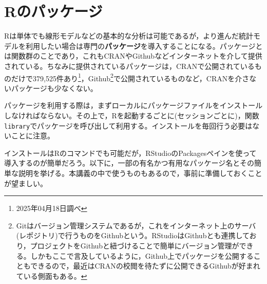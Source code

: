 \documentclass[
  a4paper,
]{ltjsbook}
\begin{document}
\section{Rのパッケージ}\label{rux306eux30d1ux30c3ux30b1ux30fcux30b8}

Rは単体でも線形モデルなどの基本的な分析は可能であるが，より進んだ統計モデルを利用したい場合は専門の\textbf{パッケージ}を導入することになる。パッケージとは関数群のことであり，これもCRANやGithubなどインターネットを介して提供されている。ちなみに提供されているパッケージは，CRANで公開されているものだけで379,525件あり\footnote{2025年04月18日調べ}，Github\footnote{Gitはバージョン管理システムであるが，これをインターネット上のサーバ(レポジトリ)で行うものをGithubという。RStudioはGithubとも連携しており，プロジェクトをGithubと紐づけることで簡単にバージョン管理ができる。しかもここで言及しているように，Github上でパッケージを公開することもできるので，最近はCRANの校閲を待たずに公開できるGithubが好まれている側面もある。}で公開されているものなど，CRANを介さないパッケージも少なくない。

パッケージを利用する際は，まずローカルにパッケージファイルをインストールしなければならない。その上で，Rを起動するごとに(セッションごとに)，関数\texttt{library}でパッケージを呼び出して利用する。インストールを毎回行う必要はないことに注意。

インストールはRのコマンドでも可能だが，RStudioのPackagesペインを使って導入するのが簡単だろう。以下に，一部の有名かつ有用なパッケージ名とその簡単な説明を挙げる。本講義の中で使うものもあるので，事前に準備しておくことが望ましい。
\end{document}
